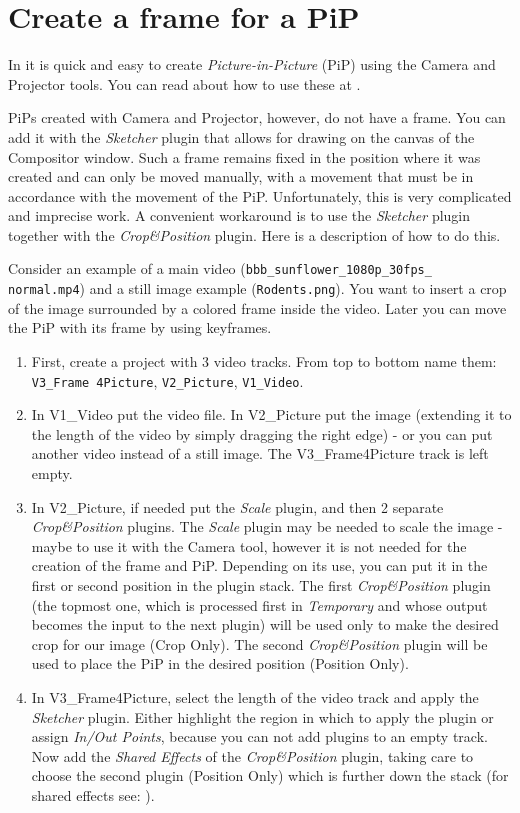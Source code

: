 \section{Create a frame for a PiP}%
\label{sec:create_frame_pip}

In  \CGG{} it is quick and easy to create \textit{Picture-in-Picture} (PiP) using the Camera and Projector tools. You can read about how to use these at .

PiPs created with Camera and Projector, however, do not have a frame. You can add it with the \textit{Sketcher} plugin that allows for drawing on the canvas of the Compositor window. Such a frame remains fixed in the position where it was created  and can only be moved manually, with a movement that must be in accordance with the movement of the PiP. Unfortunately, this is very complicated and imprecise work.
A convenient workaround is to use the \textit{Sketcher} plugin together with the \textit{Crop\&Position} plugin. Here is a description of how to do this.

Consider an example of a main video (\texttt{bbb\_sunflower\_1080p\_30fps\_ normal.mp4}) and a still image example (\texttt{Rodents.png}). You want to insert a crop of the image surrounded by a colored frame inside the video. Later you can move the PiP with its frame by using keyframes.

\begin{enumerate}
        \item First, create a project with 3 video tracks. From top to bottom name them: \texttt{V3\_Frame 4Picture}, \texttt{V2\_Picture}, \texttt{V1\_Video}.
        \item In V1\_Video put the video file. In V2\_Picture put the image (extending it to the length of the video by simply dragging the right edge) - or you can put another video instead of a still image. The V3\_Frame4Picture track is left empty.
        \item In V2\_Picture, if needed put the \textit{Scale} plugin, and then 2 separate \textit{Crop\&Position} plugins. The \textit{Scale} plugin may be needed to scale the image -  maybe to use it with the Camera tool, however it is not needed for the creation of the frame and PiP. Depending on its use, you can put it in the first or second position in the plugin stack. The first \textit{Crop\&Position} plugin (the topmost one, which is processed first in \textit{Temporary} and whose output becomes the input to the next plugin) will be used only to make the desired crop for our image (Crop Only). The second \textit{Crop\&Position} plugin will be used to place the PiP in the desired position (Position Only).
        \item In V3\_Frame4Picture, select the length of the video track and apply the \textit{Sketcher} plugin. Either highlight the region in which to apply the plugin or assign \textit{In/Out Points}, because you can not add plugins to an empty track. Now add the \textit{Shared Effects} of the \textit{Crop\&Position} plugin, taking care to choose the second plugin (Position Only) which is further down the stack (for shared effects see: ).
\end{enumerate}

